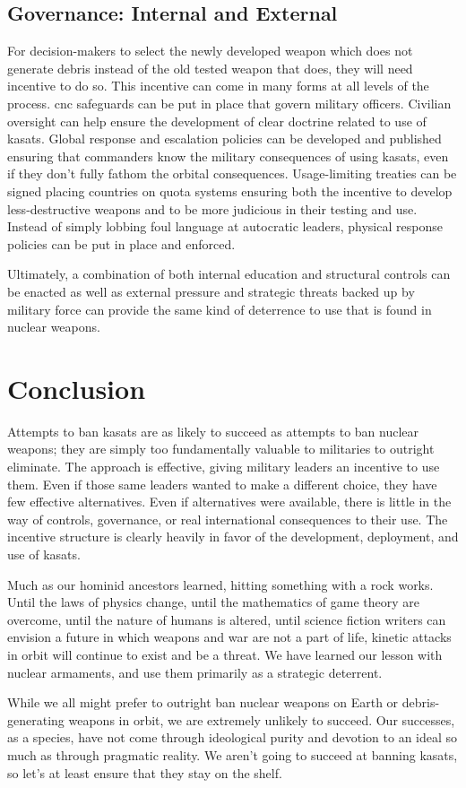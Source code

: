 \subsection*{Governance: Internal and External}
For decision-makers to select the newly developed weapon which does
not generate debris instead of the old tested weapon that does, they
will need incentive to do so.  This incentive can come in many forms
at all levels of the process. \ac{cnc} safeguards can be put in place
that govern military officers.  Civilian oversight can help ensure the
development of clear doctrine related to use of \acp{kasat}.  Global
response and escalation policies can be developed and published
ensuring that commanders know the military consequences of using
\acp{kasat}, even if they don't fully fathom the orbital consequences.
Usage-limiting treaties can be signed placing countries on quota
systems ensuring both the incentive to develop less-destructive
weapons and to be more judicious in their testing and use.  Instead of
simply lobbing foul language at autocratic leaders, physical response
policies can be put in place and enforced.

Ultimately, a combination of both internal education and structural
controls can be enacted as well as external pressure and strategic
threats backed up by military force can provide the same kind of
deterrence to use that is found in nuclear weapons.

\section*{Conclusion}
Attempts to ban \acp{kasat} are as likely to succeed as attempts to
ban nuclear weapons; they are simply too fundamentally valuable to
militaries to outright eliminate.  The approach is effective, giving
military leaders an incentive to use them.  Even if those same leaders
wanted to make a different choice, they have few effective
alternatives.  Even if alternatives were available, there is little in
the way of controls, governance, or real international consequences to
their use.  The incentive structure is clearly heavily in favor of the
development, deployment, and use of \acp{kasat}.

Much as our hominid ancestors learned, hitting something with a rock
works.  Until the laws of physics change, until the mathematics of
game theory are overcome, until the nature of humans is altered, until
science fiction writers can envision a future in which weapons and war
are not a part of life, kinetic attacks in orbit will continue to
exist and be a threat.  We have learned our lesson with nuclear
armaments, and use them primarily as a strategic deterrent.  

While we all might prefer to outright ban nuclear weapons on Earth or
debris-generating weapons in orbit, we are extremely unlikely to
succeed.  Our successes, as a species, have not come through ideological
purity and devotion to an ideal so much as through pragmatic reality.
We aren't going to succeed at banning \aclp{kasat}, so let's at least
ensure that they stay on the shelf.
